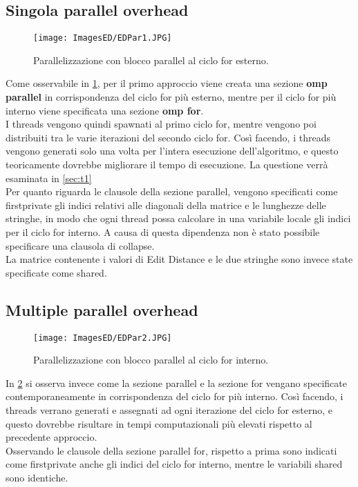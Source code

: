 \documentclass[10pt,twocolumn,letterpaper]{article}
\begin{document}
\subsection{Singola parallel overhead}

\begin{figure}[h]
    \centering
    \texttt{[image: ImagesED/EDPar1.JPG]}
    \caption{Parallelizzazione con blocco parallel al ciclo for esterno.}
    \label{fig:par1}
\end{figure}

Come osservabile in \cref{fig:par1}, per il primo approccio viene creata una sezione \textbf{omp parallel} in corrispondenza del ciclo for più esterno, mentre per il ciclo for più interno viene specificata una sezione \textbf{omp for}.\\
I threads vengono quindi spawnati al primo ciclo for, mentre vengono poi distribuiti tra le varie iterazioni del secondo ciclo for. Così facendo, i threads vengono generati solo una volta per l'intera esecuzione dell'algoritmo, e questo teoricamente dovrebbe migliorare il tempo di esecuzione. La questione verrà esaminata in \cref{sec:t1} \\
Per quanto riguarda le clausole della sezione parallel, vengono specificati come firstprivate gli indici relativi alle diagonali della matrice e le lunghezze delle stringhe, in modo che ogni thread possa calcolare in una variabile locale gli indici per il ciclo for interno. A causa di questa dipendenza non è stato possibile specificare una clausola di collapse.\\
La matrice contenente i valori di Edit Distance e le due stringhe sono invece state specificate come shared.

\subsection{Multiple parallel overhead}

\begin{figure}[h]
    \centering
    \texttt{[image: ImagesED/EDPar2.JPG]}
    \caption{Parallelizzazione con blocco parallel al ciclo for interno.}
    \label{fig:par2}
\end{figure}

In \cref{fig:par2} si osserva invece come la sezione parallel e la sezione for vengano specificate contemporaneamente in corrispondenza del ciclo for più interno. Così facendo, i threads verrano generati e assegnati ad ogni iterazione del ciclo for esterno, e questo dovrebbe risultare in tempi computazionali più elevati rispetto al precedente approccio.\\
Osservando le clausole della sezione parallel for, rispetto a prima sono indicati come firstprivate anche gli indici del ciclo for interno, mentre le variabili shared sono identiche.
\end{document}
